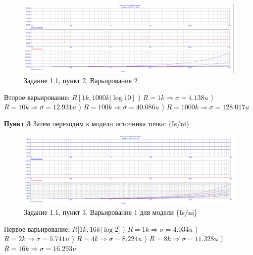 \documentclass[a4paper, 14pt]{extarticle}%
\begin{document}
\begin{figure}[h!]
	\centering
			\includegraphics[width=1.1\linewidth]{pic2.jpg}
			\caption{Задание 1.1, пункт 2, Варьирование 2}
	\label{A}
\end{figure}

Второе варьирование: $R[1k, 1000k | \log10]$
) $R = 1k \Rightarrow \sigma = 4.138u$
) $R = 10k \Rightarrow \sigma = 12.931u$
) $R = 100k \Rightarrow \sigma = 40.086u$
) $R = 1000k \Rightarrow \sigma = 128.017u$
\newline

\textbf{Пункт 3}
\newline
Затем переходим к модели источника точка: \{Is/ni\}

\begin{figure}[h!]
			\centering
			\includegraphics[width=1.1\linewidth]{pic3.jpg}
			\caption{Задание 1.1, пункт 3, Варьирование 1 для модели \{Is/ni\}}
			\label{A}
\end{figure}


Первое варьирование: $R[1k, 16k | \log2$]
) $R = 1k \Rightarrow \sigma = 4.034u$
) $R = 2k \Rightarrow \sigma = 5.741u$
) $R = 4k \Rightarrow \sigma = 8.224u$
) $R = 8k \Rightarrow \sigma = 11.328u$
) $R = 16k \Rightarrow \sigma = 16.293u$
\newline
\end{document}

